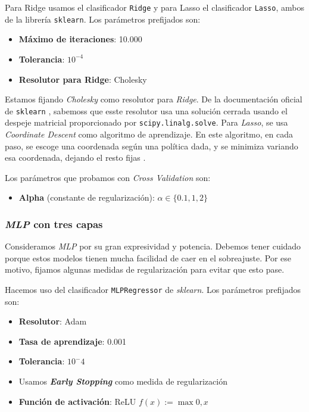 \documentclass[11pt]{article}
\begin{document}
Para Ridge usamos el clasificador \lstinline{Ridge} y para Lasso el clasificador \lstinline{Lasso}, ambos de la librería \lstinline{sklearn}. Los parámetros prefijados son:

\begin{itemize}
  \item \textbf{Máximo de iteraciones}: 10.000
  \item \textbf{Tolerancia}: $10^{-4}$
  \item \textbf{Resolutor para Ridge}: Cholesky
\end{itemize}

Estamos fijando \emph{Cholesky} como resolutor para \emph{Ridge}. De la documentación oficial de \lstinline{sklearn} \cite{sk_linear:online}, sabemoss que  esste resolutor usa una solución cerrada usando el despeje matricial proporcionado por \lstinline{scipy.linalg.solve}. Para \emph{Lasso}, se usa \emph{Coordinate Descent} como algoritmo de aprendizaje. En este algoritmo, en cada paso, se escoge una coordenada según una política dada, y se minimiza variando esa coordenada, dejando el resto fijas \cite{coordinate_descent:online}.

Los parámetros que probamos con \emph{Cross Validation} son:

\begin{itemize}
  \item \textbf{Alpha} (constante de regularización): $\alpha \in \{0.1, 1, 2\}$
\end{itemize}

\subsubsection{\emph{MLP} con tres capas} \label{mlp}

Consideramos \emph{MLP} por su gran expresividad y potencia. Debemos tener cuidado porque estos modelos tienen mucha facilidad de caer en el sobreajuste. Por ese motivo, fijamos algunas medidas de regularización para evitar que esto pase.

Hacemos uso del clasificador \lstinline{MLPRegressor} de \emph{sklearn}. Los parámetros prefijados son:

\begin{itemize}
  \item \textbf{Resolutor}: Adam
  \item \textbf{Tasa de aprendizaje}: 0.001
  \item \textbf{Tolerancia}: $10^-4$
  \item Usamos \textbf{\emph{Early Stopping}} como medida de regularización
  \item \textbf{Función de activación}: ReLU $f(x) := \max{0,x}$
\end{itemize}
\end{document}
